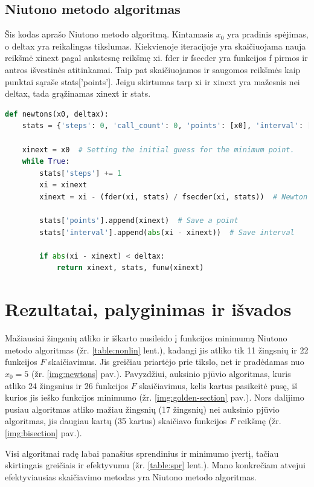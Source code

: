 \documentclass{VUMIFPSkursinis}
\begin{document}
\subsection{Niutono metodo algoritmas}
Šis kodas aprašo Niutono metodo algoritmą.
Kintamasis $x_0$ yra pradinis spėjimas, o deltax yra reikalingas tikslumas.
Kiekvienoje iteracijoje yra skaičiuojama nauja reikšmė xinext pagal ankstesnę reikšmę xi.
fder ir fsecder yra funkcijos f pirmos ir antros išvestinės atitinkamai. 
Taip pat skaičiuojamos ir saugomos reikšmės kaip punktai sąraše stats['points'].
Jeigu skirtumas tarp xi ir xinext yra mažesnis nei deltax, tada grąžinamas xinext ir stats.

\begin{lstlisting}[language=Python]
def newtons(x0, deltax):
    stats = {'steps': 0, 'call_count': 0, 'points': [x0], 'interval': []}

    xinext = x0  # Setting the initial guess for the minimum point.
    while True:
        stats['steps'] += 1
        xi = xinext
        xinext = xi - (fder(xi, stats) / fsecder(xi, stats))  # Newton's method formula.

        stats['points'].append(xinext)  # Save a point
        stats['interval'].append(abs(xi - xinext))  # Save interval

        if abs(xi - xinext) < deltax:
            return xinext, stats, funw(xinext)
\end{lstlisting}

\section{Rezultatai, palyginimas ir išvados}

Mažiausiai žingsnių atliko ir iškarto nusileido į funkcijos minimumą Niutono metodo algoritmas (žr. \ref{table:nonlin} lent.), kadangi jis atliko tik 11 žingsnių ir 22 funkcijos $F$ skaičiavimus. Jis greičiau priartėjo prie tikslo, net ir pradėdamas nuo $x_0 = 5$ (žr. \ref{img:newtons} pav.).
Pavyzdžiui, auksinio pjūvio algoritmas, kuris atliko 24 žingsnius ir 26 funkcijos $F$ skaičiavimus, kelis kartus pasikeitė pusę, iš kurios jis ieško funkcijos minimumo (žr. \ref{img:golden-section} pav.).
Nors dalijimo pusiau algoritmas atliko mažiau žingsnių (17 žingsnių) nei auksinio pjūvio algoritmas, jis daugiau kartų (35 kartus) skaičiavo funkcijos $F$ reikšmę (žr. \ref{img:bisection} pav.).

Visi algoritmai radę labai panašius sprendinius ir minimumo įvertį, tačiau skirtingais greičiais ir efektyvumu (žr. \ref{table:spr} lent.). Mano konkrečiam atvejui efektyviausias skaičiavimo metodas yra Niutono metodo algoritmas.
\end{document}
